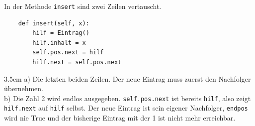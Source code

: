 \question[3]
In der Methode \texttt{insert} sind zwei Zeilen vertauscht.
\begin{lstlisting}
    def insert(self, x):
        hilf = Eintrag()
        hilf.inhalt = x
        self.pos.next = hilf
        hilf.next = self.pos.next
\end{lstlisting}
\begin{solutionbox}{3.5cm}
a) Die letzten beiden Zeilen. Der neue Eintrag muss zuerst den Nachfolger übernehmen. \\
b) Die Zahl 2 wird endlos ausgegeben. \texttt{self.pos.next} ist bereits \texttt{hilf}, also zeigt \texttt{hilf.next}
auf \texttt{hilf} selbst. Der neue Eintrag ist sein eigener Nachfolger, \texttt{endpos} wird nie True und der bisherige
Eintrag mit der 1 ist nicht mehr erreichbar.
\end{solutionbox}
